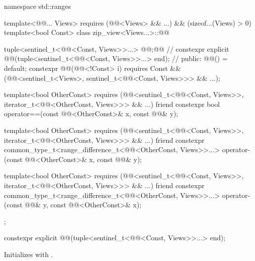 %
\begin{codeblock}
namespace std::ranges {
  template<@@... Views>
    requires (@@<Views> && ...) && (sizeof...(Views) > 0)
  template<bool Const>
  class zip_view<Views...>::@@ {
    tuple<sentinel_t<@@<Const, Views>>...> @@;@\itcorr[-1]@               // \expos
    constexpr explicit @@(tuple<sentinel_t<@@<Const, Views>>...> end);
                                                                                // \expos
  public:
    @@() = default;
    constexpr @@(@@<!Const> i)
      requires Const &&
               (@@<sentinel_t<Views>, sentinel_t<@@<Const, Views>>> && ...);

    template<bool OtherConst>
      requires (@@<sentinel_t<@@<Const, Views>>,
                             iterator_t<@@<OtherConst, Views>>> && ...)
    friend constexpr bool operator==(const @@<OtherConst>& x, const @@& y);

    template<bool OtherConst>
      requires (@@<sentinel_t<@@<Const, Views>>,
                                   iterator_t<@@<OtherConst, Views>>> && ...)
    friend constexpr common_type_t<range_difference_t<@@<OtherConst, Views>>...>
      operator-(const @@<OtherConst>& x, const @@& y);

    template<bool OtherConst>
      requires (@@<sentinel_t<@@<Const, Views>>,
                                   iterator_t<@@<OtherConst, Views>>> && ...)
    friend constexpr common_type_t<range_difference_t<@@<OtherConst, Views>>...>
      operator-(const @@& y, const @@<OtherConst>& x);
  };
}
\end{codeblock}

\begin{itemdecl}
constexpr explicit @@(tuple<sentinel_t<@@<Const, Views>>...> end);
\end{itemdecl}

\begin{itemdescr}
\pnum
\effects
Initializes  with .
\end{itemdescr}

